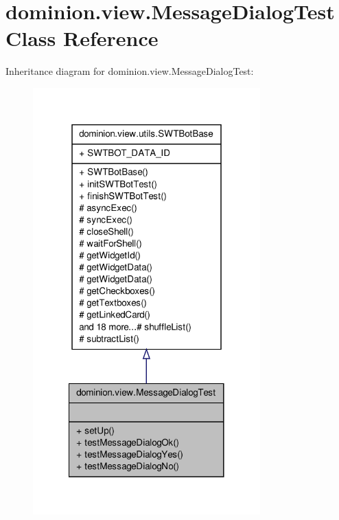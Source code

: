 \hypertarget{classdominion_1_1view_1_1MessageDialogTest}{\section{dominion.\-view.\-Message\-Dialog\-Test \-Class \-Reference}
\label{classdominion_1_1view_1_1MessageDialogTest}
}


\-Inheritance diagram for dominion.\-view.\-Message\-Dialog\-Test\-:
\nopagebreak
\begin{figure}[H]
\begin{center}
\leavevmode
\includegraphics[width=248pt]{classdominion_1_1view_1_1MessageDialogTest__inherit__graph}
\end{center}
\end{figure}


